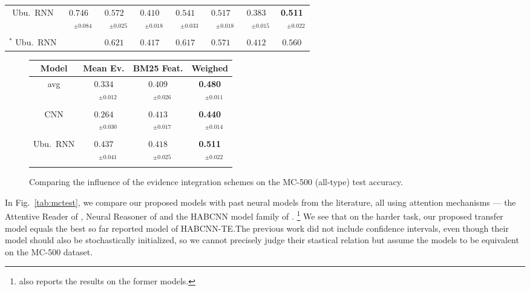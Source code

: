 \documentclass[11pt]{article}
\begin{document}
\begin{figure*}[t]
\begin{tabular}{|c|c|ccc|ccc|}
Ubu.\ RNN & $0.746$ & $0.572$ & $0.410$ & $0.541$ & $0.517$ & $0.383$ & \textbf{0.511}\\
 & $\quad^{\pm0.084}$ & $\quad^{\pm0.025}$ & $\quad^{\pm0.018}$ & $\quad^{\pm0.033}$ & $\quad^{\pm0.018}$ & $\quad^{\pm0.015}$ & $\quad^{\pm0.022}$\\
\hline
$^*$ Ubu.\ RNN & & $0.621$ & $0.417$ & $0.617$ & $0.571$ & $0.412$ & $0.560$ \\
\hline
\end{tabular}
\setlength{\tabcolsep}{6pt}
\vspace*{-0.2cm}
\caption{\footnotesize%
	Model (question-level) accuracy on the test split of the MCTest task, using the evidence weighing scheme.
	The first column shows accuracy on a train split joined across both datasets.\\
	$^*$ The top test set result across 16 runs, demonstrating the importance
	of reporting neural evaluation results statistically.
}
\label{tab:mctest}
\end{figure*}

\begin{figure}[t]
\centering
\setlength{\tabcolsep}{3pt}
\begin{tabular}{|c|c|c|c|}
\hline
Model              & Mean Ev. & BM25 Feat. & Weighed \\
\hline
avg & $0.334$ & $0.409$ & \textbf{0.480}\\
 & $\quad^{\pm0.012}$ & $\quad^{\pm0.026}$ & $\quad^{\pm0.011}$\\
\hline
CNN & $0.264$ & $0.413$ & \textbf{0.440}\\
 & $\quad^{\pm0.030}$ & $\quad^{\pm0.017}$ & $\quad^{\pm0.014}$\\
Ubu.\ RNN & $0.437$ & $0.418$ & \textbf{0.511}\\
 & $\quad^{\pm0.041}$ & $\quad^{\pm0.025}$ & $\quad^{\pm0.022}$\\
\hline
\end{tabular}
\setlength{\tabcolsep}{6pt}
\vspace*{-0.2cm}
\caption{\footnotesize%
	Comparing the influence of the evidence integration schemes on the MC-500 (all-type) test accuracy.
}
\label{tab:mctestev}
\end{figure}

In Fig.~\ref{tab:mctest}, we compare our proposed models with past neural models
from the literature, all using attention mechanisms --- the Attentive Reader of \cite{ReadComprehend},
Neural Reasoner of \cite{NeuralReasoner} and the HABCNN model family of \cite{HABCNN}.%
\footnote{\cite{HABCNN} also reports the results on the former models.}
We see that on the harder task, our proposed transfer model equals the best
so far reported model of HABCNN-TE.\@  The previous work did not include
confidence intervals, even though their model should also be stochastically initialized,
so we cannot precisely judge their stastical relation but assume the models
to be equivalent on the MC-500 dataset.
\end{document}
